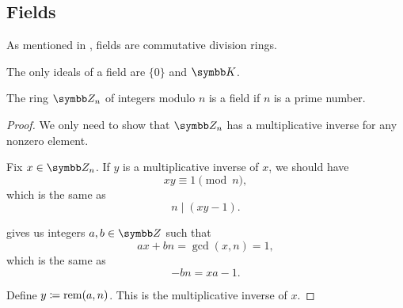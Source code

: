 \subsection{Fields}\label{subsec:fields}

\begin{definition}\label{def:field}
  As mentioned in , fields are commutative division rings.
\end{definition}

\begin{proposition}\label{thm:ideals_of_field}
  The only ideals of a field are \( \{ 0 \} \) and \( \BK \).
\end{proposition}

\begin{theorem}\label{thm:ring_of_integers_module_prime_is_field}
  The ring \( \BZ_n \) of integers modulo \( n \) is a field if \( n \) is a prime number.
\end{theorem}
\begin{proof}
  We only need to show that \( \BZ_n \) has a multiplicative inverse for any nonzero element.

  Fix \( x \in \BZ_n \). If \( y \) is a multiplicative inverse of \( x \), we should have
  \begin{equation*}
    xy \equiv 1 \pmod n,
  \end{equation*}
  which is the same as
  \begin{equation*}
    n \mid (xy - 1).
  \end{equation*}

   gives us integers \( a, b \in \BZ \) such that
  \begin{equation*}
    ax + bn = \gcd(x, n) = 1,
  \end{equation*}
  which is the same as
  \begin{equation*}
    -bn = xa - 1.
  \end{equation*}

  Define \( y \coloneqq \operatorname{rem}(a, n) \). This is the multiplicative inverse of \( x \).
\end{proof}

